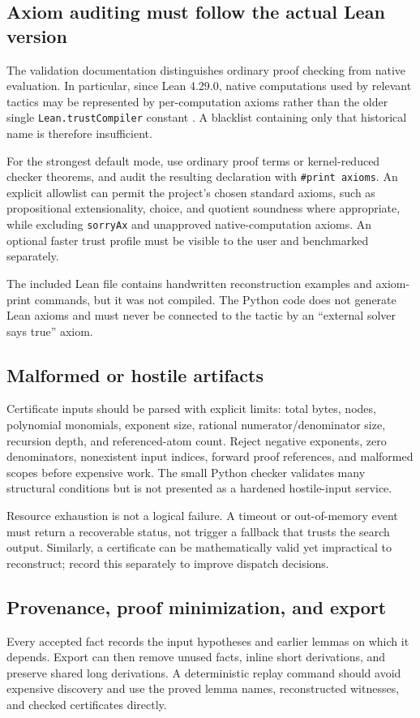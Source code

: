 \documentclass[11pt,letterpaper]{article}
\newcommand{\code}[1]{\texttt{#1}}
\theoremstyle{definition}\newtheorem{definition}[theorem]{Definition}
\theoremstyle{remark}\newtheorem{remark}[theorem]{Remark}
\begin{document}
\subsection{Axiom auditing must follow the actual Lean version}
The validation documentation distinguishes ordinary proof checking from native evaluation. In particular, since Lean 4.29.0, native computations used by relevant tactics may be represented by per-computation axioms rather than the older single \code{Lean.trustCompiler} constant \cite{validation}. A blacklist containing only that historical name is therefore insufficient.

For the strongest default mode, use ordinary proof terms or kernel-reduced checker theorems, and audit the resulting declaration with \code{\#print axioms}. An explicit allowlist can permit the project's chosen standard axioms, such as propositional extensionality, choice, and quotient soundness where appropriate, while excluding \code{sorryAx} and unapproved native-computation axioms. An optional faster trust profile must be visible to the user and benchmarked separately.

The included Lean file contains handwritten reconstruction examples and axiom-print commands, but it was not compiled. The Python code does not generate Lean axioms and must never be connected to the tactic by an ``external solver says true'' axiom.

\subsection{Malformed or hostile artifacts}
Certificate inputs should be parsed with explicit limits: total bytes, nodes, polynomial monomials, exponent size, rational numerator/denominator size, recursion depth, and referenced-atom count. Reject negative exponents, zero denominators, nonexistent input indices, forward proof references, and malformed scopes before expensive work. The small Python checker validates many structural conditions but is not presented as a hardened hostile-input service.

Resource exhaustion is not a logical failure. A timeout or out-of-memory event must return a recoverable status, not trigger a fallback that trusts the search output. Similarly, a certificate can be mathematically valid yet impractical to reconstruct; record this separately to improve dispatch decisions.

\subsection{Provenance, proof minimization, and export}
Every accepted fact records the input hypotheses and earlier lemmas on which it depends. Export can then remove unused facts, inline short derivations, and preserve shared long derivations. A deterministic replay command should avoid expensive discovery and use the proved lemma names, reconstructed witnesses, and checked certificates directly.
\end{document}
